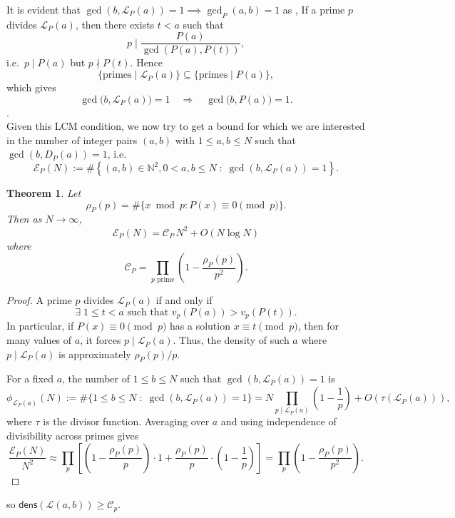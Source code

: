 \documentclass[12pt, reqno]{amsart}
\newtheorem{theorem}{Theorem}[section]
\theoremstyle{definition}
\theoremstyle{remark}
\numberwithin{equation}{section}
\begin{document}
It is evident that $\gcd(b,\mathscr{L}_P(a))=1 \implies \gcd_P(a,b)=1$ as , If a prime $p$ divides $\mathscr{L}_P(a)$, then there exists $t<a$ such that
\[p\mid\frac{P(a)}{\gcd(P(a),P(t))},\]
i.e.\ $p\mid P(a)$ but $p\nmid P(t)$.  Hence
\[
\{\text{primes}\mid \mathscr{L}_P(a)\}\subseteq\{\text{primes}\mid P(a)\},
\]
which gives
\[
\gcd\bigl(b,\mathscr{L}_P(a)\bigr)=1\quad\Longrightarrow\quad\gcd\bigl(b,P(a)\bigr)=1.
\].\\

Given this LCM condition, we now try to get a bound for which 
 we are interested in the number of integer pairs \( (a,b) \) with \( 1 \leq a,b \leq N \) such that \( \gcd(b, D_P(a)) = 1 \), i.e.
\[
\mathscr{E}_P(N) := \#\left\{ (a,b) \in \mathbb{N}^{2} , 0<a, b \leq N \;:\; \gcd(b, \mathscr{L}_P(a)) = 1 \right\}.
\]
\begin{theorem}
Let 
\[
\rho_P(p)=\#\{x\bmod p: P(x)\equiv0\pmod p\}.
\]
Then as \(N\to\infty\),
\[
\boxed{
\mathscr{E}_P(N)
=
\mathcal{C}_P\,N^2+O(N\log N)
}
\]
where
\[
\boxed{
\mathcal{C}_P
=
\prod_{p\text{ prime}}
\left(1-\frac{\rho_P(p)}{p^2}\right).
}
\]
\end{theorem}

\begin{proof}
A prime \( p \) divides \( \mathscr{L}_P(a) \) if and only if
\[
\exists \; 1 \leq t < a \text{ such that } v_p(P(a)) > v_p(P(t)).
\]
In particular, if \( P(x) \equiv 0 \pmod{p} \) has a solution \( x \equiv t \pmod{p} \), then for many values of \( a \), it forces \( p \mid \mathscr{L}_P(a) \). Thus, the density of such \( a \) where \( p \mid \mathscr{L}_P(a) \) is approximately \( \rho_P(p)/p \).

\medskip

For a fixed \( a \), the number of \( 1 \le b \le N \) such that \( \gcd(b, \mathscr{L}_P(a)) = 1 \) is
\[
\phi_{\mathscr{L}_P(a)}(N) := \#\{ 1 \le b \le N \;:\; \gcd(b, \mathscr{L}_P(a)) = 1 \} = N \prod_{p \mid \mathscr{L}_P(a)} \left(1 - \frac{1}{p} \right) + O(\tau(\mathscr{L}_P(a))),
\]
where \( \tau \) is the divisor function. Averaging over \( a \) and using independence of divisibility across primes gives
\[
\frac{\mathscr{E}_P(N)}{N^2} \approx \prod_{p} \left[ \left(1 - \frac{\rho_P(p)}{p} \right)\cdot 1 + \frac{\rho_P(p)}{p}\cdot \left(1 - \frac{1}{p} \right) \right] = \prod_{p} \left(1 - \frac{\rho_P(p)}{p^2} \right).
\]

\medskip
\end{proof}
so $\mathsf{dens}(\mathcal{L}(a,b)) \ge \mathcal{C}_{p}.$\\
\end{document}
